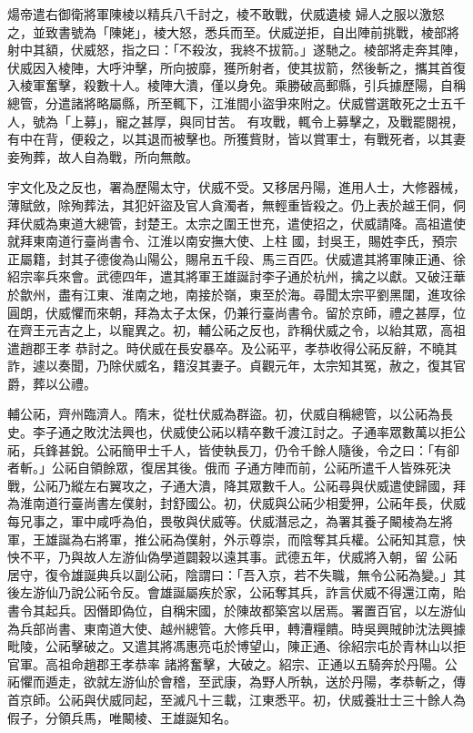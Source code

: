 \begin{pinyinscope}
 煬帝遣右御衛將軍陳棱以精兵八千討之，棱不敢戰，伏威遺棱
 婦人之服以激怒之，並致書號為「陳姥」，棱大怒，悉兵而至。伏威逆拒，自出陣前挑戰，棱部將射中其額，伏威怒，指之曰：「不殺汝，我終不拔箭。」遂馳之。棱部將走奔其陣，伏威因入棱陣，大呼沖擊，所向披靡，獲所射者，使其拔箭，然後斬之，攜其首復入棱軍奮擊，殺數十人。棱陣大潰，僅以身免。乘勝破高郵縣，引兵據歷陽，自稱總管，分遣諸將略屬縣，所至輒下，江淮間小盜爭來附之。伏威嘗選敢死之士五千人，號為「上募」，寵之甚厚，與同甘苦。
 有攻戰，輒令上募擊之，及戰罷閱視，有中在背，便殺之，以其退而被擊也。所獲貲財，皆以賞軍士，有戰死者，以其妻妾殉葬，故人自為戰，所向無敵。



 宇文化及之反也，署為歷陽太守，伏威不受。又移居丹陽，進用人士，大修器械，薄賦斂，除殉葬法，其犯奸盜及官人貪濁者，無輕重皆殺之。仍上表於越王侗，侗拜伏威為東道大總管，封楚王。太宗之圍王世充，遣使招之，伏威請降。高祖遣使就拜東南道行臺尚書令、江淮以南安撫大使、上柱
 國，封吳王，賜姓李氏，預宗正屬籍，封其子德俊為山陽公，賜帛五千段、馬三百匹。伏威遣其將軍陳正通、徐紹宗率兵來會。武德四年，遣其將軍王雄誕討李子通於杭州，擒之以獻。又破汪華於歙州，盡有江東、淮南之地，南接於嶺，東至於海。尋聞太宗平劉黑闥，進攻徐圓朗，伏威懼而來朝，拜為太子太保，仍兼行臺尚書令。留於京師，禮之甚厚，位在齊王元吉之上，以寵異之。初，輔公祏之反也，詐稱伏威之令，以紿其眾，高祖遣趙郡王孝
 恭討之。時伏威在長安暴卒。及公祏平，孝恭收得公祏反辭，不曉其詐，遽以奏聞，乃除伏威名，籍沒其妻子。貞觀元年，太宗知其冤，赦之，復其官爵，葬以公禮。



 輔公祏，齊州臨濟人。隋末，從杜伏威為群盜。初，伏威自稱總管，以公祏為長史。李子通之敗沈法興也，伏威使公祏以精卒數千渡江討之。子通率眾數萬以拒公祏，兵鋒甚銳。公祏簡甲士千人，皆使執長刀，仍令千餘人隨後，令之曰：「有卻者斬。」公祏自領餘眾，復居其後。俄而
 子通方陣而前，公祏所遣千人皆殊死決戰，公祏乃縱左右翼攻之，子通大潰，降其眾數千人。公祏尋與伏威遣使歸國，拜為淮南道行臺尚書左僕射，封舒國公。初，伏威與公祏少相愛狎，公祏年長，伏威每兄事之，軍中咸呼為伯，畏敬與伏威等。伏威潛忌之，為署其養子闞棱為左將軍，王雄誕為右將軍，推公祏為僕射，外示尊崇，而陰奪其兵權。公祏知其意，怏怏不平，乃與故人左游仙偽學道闢穀以遠其事。武德五年，伏威將入朝，留
 公祏居守，復令雄誕典兵以副公祏，陰謂曰：「吾入京，若不失職，無令公祏為變。」其後左游仙乃說公祏令反。會雄誕屬疾於家，公祏奪其兵，詐言伏威不得還江南，貽書令其起兵。因僭即偽位，自稱宋國，於陳故都築宮以居焉。署置百官，以左游仙為兵部尚書、東南道大使、越州總管。大修兵甲，轉漕糧饋。時吳興賊帥沈法興據毗陵，公祏擊破之。又遣其將馮惠亮屯於博望山，陳正通、徐紹宗屯於青林山以拒官軍。高祖命趙郡王孝恭率
 諸將奮擊，大破之。紹宗、正通以五騎奔於丹陽。公祏懼而遁走，欲就左游仙於會稽，至武康，為野人所執，送於丹陽，孝恭斬之，傳首京師。公祏與伏威同起，至滅凡十三載，江東悉平。初，伏威養壯士三十餘人為假子，分領兵馬，唯闞棱、王雄誕知名。




\end{pinyinscope}
